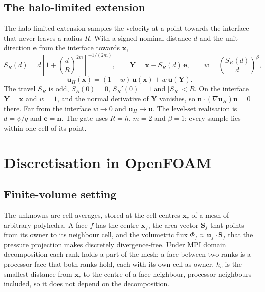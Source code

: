 \documentclass[preprint,3p,11pt]{elsarticle}
\newcommand{\psilev}{\psi}
\newcommand{\nhat}{\mathbf{n}}
\newcommand{\bu}{\mathbf{u}}
\newcommand{\bx}{\mathbf{x}}
\begin{document}
\subsection{The halo-limited extension}
\label{sec:model-hl}
The halo-limited extension \cite{BotheDossierHalo2026} samples the velocity at a point
towards the interface that never leaves a radius $R$. With a signed nominal distance
$d$ and the unit direction $\mathbf e$ from the interface towards $\bx$,
\begin{equation}
  S_R(d)=d\left[1+\left(\frac{d}{R}\right)^{2m}\right]^{-1/(2m)},\qquad
  \mathbf Y=\bx-S_R(d)\,\mathbf e,\qquad
  w=\left(\frac{S_R(d)}{d}\right)^{\beta},
  \label{eq:hl}
\end{equation}
\begin{equation}
  \bu_H(\bx)=(1-w)\,\bu(\bx)+w\,\bu(\mathbf Y).
  \label{eq:uH}
\end{equation}
The travel $S_R$ is odd, $S_R(0)=0$, $S_R'(0)=1$ and $|S_R|<R$. On the interface
$\mathbf Y=\bx$ and $w=1$, and the normal derivative of $\mathbf Y$ vanishes, so
$\nhat\cdot(\nabla\bu_H)\nhat=0$ there. Far from the interface $w\to0$ and $\bu_H\to\bu$.
The level-set realisation is $d=\psilev/q$ and $\mathbf e=\nhat$. The gate uses
$R=h$, $m=2$ and $\beta=1$: every sample lies within one cell of its point.

\section{Discretisation in OpenFOAM}
\label{sec:fv}

\subsection{Finite-volume setting}
The unknowns are cell averages, stored at the cell centres $\bx_c$ of a mesh of
arbitrary polyhedra. A face $f$ has the centre $\bx_f$, the area vector
$\mathbf S_f$ that points from its owner to its neighbour cell, and the volumetric flux
$\Phi_f\approx\bu_f\cdot\mathbf S_f$ that the pressure projection makes discretely
divergence-free. Under MPI domain decomposition each rank holds a part of the mesh; a
face between two ranks is a processor face that both ranks hold, each with its own cell
as owner. $h_c$ is the smallest distance from $\bx_c$ to the centre of a face
neighbour, processor neighbours included, so it does not depend on the decomposition.
\end{document}
